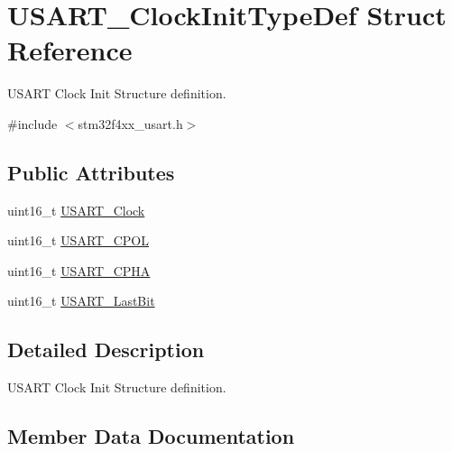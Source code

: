 \hypertarget{struct_u_s_a_r_t___clock_init_type_def}{}\section{U\+S\+A\+R\+T\+\_\+\+Clock\+Init\+Type\+Def Struct Reference}
\label{struct_u_s_a_r_t___clock_init_type_def}


U\+S\+A\+RT Clock Init Structure definition.  




{\ttfamily \#include $<$stm32f4xx\+\_\+usart.\+h$>$}

\subsection*{Public Attributes}
\begin{DoxyCompactItemize}
\item 
uint16\+\_\+t \hyperlink{struct_u_s_a_r_t___clock_init_type_def_a229ba7c3f9a4d6d56513e6899f6c6693}{U\+S\+A\+R\+T\+\_\+\+Clock}
\item 
uint16\+\_\+t \hyperlink{struct_u_s_a_r_t___clock_init_type_def_a01450cba8a40cf9a624b25979dc6aa77}{U\+S\+A\+R\+T\+\_\+\+C\+P\+OL}
\item 
uint16\+\_\+t \hyperlink{struct_u_s_a_r_t___clock_init_type_def_abda3a2172bd5819e1c207dc0d1c822d8}{U\+S\+A\+R\+T\+\_\+\+C\+P\+HA}
\item 
uint16\+\_\+t \hyperlink{struct_u_s_a_r_t___clock_init_type_def_ab1b28d63d2be6e57849666d78a4467bd}{U\+S\+A\+R\+T\+\_\+\+Last\+Bit}
\end{DoxyCompactItemize}


\subsection{Detailed Description}
U\+S\+A\+RT Clock Init Structure definition. 

\subsection{Member Data Documentation}
